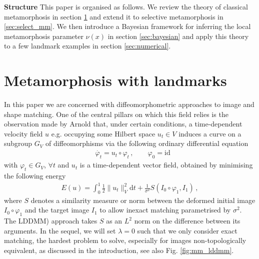 \documentclass[runningheads]{llncs}
\newcommand{\half}{\frac 12}
\newcommand{\norm}[2]{\| #1 \|_{ #2 }}
\newcommand{\vnorm}[1]{\norm{ #1 }{V}}
\newcommand{\diff}[1]{\text{d} #1}
\begin{document}
{\bf Structure} This paper is organised as follows. We review the theory of
classical metamorphosis in section \ref{sec:bg} and extend it to selective
metamorphosis in \ref{sec:select_mm}.  We then introduce a Bayesian framework
for inferring the local metamorphosis parameter $\nu(x)$ in section
\ref{sec:bayesian} and apply this theory to a few landmark examples in section
\ref{sec:numerical}.

\section{Metamorphosis with landmarks}\label{sec:bg}

In this paper we are concerned with diffeomorphometric approaches to image and
shape matching. One of the central pillars on which this field relies is the
observation made by Arnold \cite{arnold1966geometrie} that, under certain
conditions, a time-dependent velocity field $u$ e.g. occupying some Hilbert
space $u_t \in V$ induces a curve on a subgroup $G_V$ of diffeomorphisms
\cite{younes2010shapes} via the following ordinary differential equation
\begin{align}
& \dot{\varphi_t} = u_t \circ \varphi_t\, , \qquad  \varphi_0 = \text{id}
  \label{diffeo}
\end{align}
with $\varphi_t \in G_V$, $\forall t$ and $u_t$ is a time-dependent vector
field, obtained by minimising the following energy
\begin{align}
  E(u) = \int_0^1 \half\vnorm{u_t}^2 \diff{t} + \frac{1}{\sigma^2}
  S(I_0\circ\varphi_1, I_1)\, , \label{E-def}
\end{align}
where $S$ denotes a similarity measure or norm between the deformed initial
image $I_0\circ \varphi_1$ and the target image $I_1$ to allow inexact matching
parametrised by $\sigma^2$. The LDDMM) approach takes $S$ as an $L^2$ norm on the difference between
its arguments.
In the sequel, we will set $\lambda=0$ such that we
only consider exact matching, the hardest problem to solve, especially for
images non-topologically equivalent, as discussed in the introduction, see also
Fig. \ref{fig:mm_lddmm}.
\end{document}
